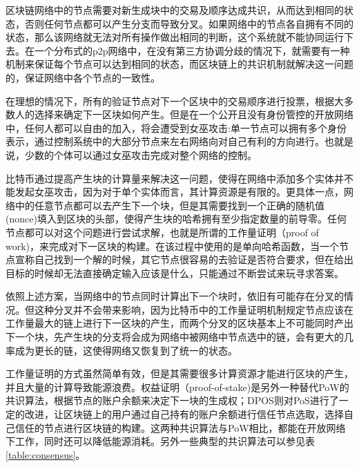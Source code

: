 区块链网络中的节点需要对新生成块中的交易及顺序达成共识，从而达到相同的状态，否则任何节点都可以产生分支而导致分叉。如果网络中的节点各自拥有不同的状态，那么该网络就无法对所有操作做出相同的判断，这个系统就不能协同运行下去。在一个分布式的p2p网络中，在没有第三方协调分歧的情况下，就需要有一种机制来保证每个节点可以达到相同的状态，而区块链上的共识机制就解决这一问题的，保证网络中各个节点的一致性。

在理想的情况下，所有的验证节点对下一个区块中的交易顺序进行投票，根据大多数人的选择来确定下一区块如何产生。但是在一个公开且没有身份管控的开放网络中，任何人都可以自由的加入，将会遭受到女巫攻击\cite{douceur2002sybil}:单一节点可以拥有多个身份表示，通过控制系统中的大部分节点来左右网络向对自己有利的方向进行。也就是说，少数的个体可以通过女巫攻击完成对整个网络的控制。

比特币通过提高产生块的计算量来解决这一问题，使得在网络中添加多个实体并不能发起女巫攻击，因为对于单个实体而言，其计算资源是有限的。更具体一点，网络中的任意节点都可以去产生下一个块，但是其需要找到一个正确的随机值(nonce)填入到区块的头部，使得产生块的哈希拥有至少指定数量的前导零\cite{antonopoulos2014mastering}。任何节点都可以对这个问题进行尝试求解，也就是所谓的工作量证明（proof of work)，来完成对下一区块的构建\cite{nakamoto2008bitcoin}。在该过程中使用的是单向哈希函数，当一个节点宣称自己找到一个解的时候，其它节点很容易的去验证是否符合要求，但在给出目标的时候却无法直接确定输入应该是什么，只能通过不断尝试来玩寻求答案。

依照上述方案，当网络中的节点同时计算出下一个块时，依旧有可能存在分叉的情况。但这种分叉并不会带来影响，因为比特币中的工作量证明机制规定节点应该在工作量最大的链上进行下一区块的产生，而两个分叉的区块基本上不可能同时产出下一个块，先产生块的分支将会成为网络中被网络中节点选中的链，会有更大的几率成为更长的链，这使得网络又恢复到了统一的状态。


工作量证明的方式虽然简单有效，但是其需要很多计算资源才能进行区块的产生，并且大量的计算导致能源浪费。权益证明（proof-of-stake)\cite{vasin2014blackcoin}是另外一种替代PoW的共识算法，根据节点的账户余额来决定下一块的生成权；DPOS则对PoS进行了一定的改进，让区块链上的用户通过自己持有的账户余额进行信任节点选取，选择自己信任的节点进行区块链的构建。这两种共识算法与PoW相比，都能在开放网络下工作，同时还可以降低能源消耗。另外一些典型的共识算法可以参见表\ref{table:consensus}。


